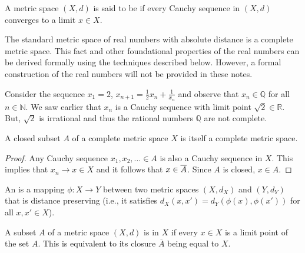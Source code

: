 \begin{definition}
A metric space $(X,d)$ is said to be  if every Cauchy sequence in $(X,d)$ converges to a limit $x \in X$.
\end{definition}

The standard metric space of real numbers with absolute distance is a complete metric space.
This fact and other foundational properties of the real numbers can be derived formally using the techniques described below.
However, a formal construction of the real numbers will not be provided in these notes.


\begin{example}
Consider the sequence $x_1 = 2$, $x_{n+1} = \frac{1}{2}x_n + \frac{1}{x_n}$ and observe that $x_n \in \mathbb{Q}$ for all $n\in \mathbb{N}$.
We saw earlier that $x_n$ is a Cauchy sequence with limit point $\sqrt{2} \in \mathbb{R}$.
But, $\sqrt{2}$ is irrational and thus the rational numbers $\mathbb{Q}$ are not complete.
\end{example}

\begin{theorem}
A closed subset $A$ of a complete metric space $X$ is itself a complete metric space.
\end{theorem}
\begin{proof}
Any Cauchy sequence $x_1,x_2,\ldots \in A$ is also a Cauchy sequence in $X$.
This implies that $x_n \to x \in X$ and it follows that $x \in \overline{A}$.
Since $A$ is closed, $x\in A$.
\end{proof}

\begin{definition}
An  is a mapping $\phi  \colon X \rightarrow Y$ between two metric spaces $(X,d_X)$ and $(Y,d_Y)$ that is distance preserving (i.e., it satisfies $d_X (x,x') = d_Y \left(\phi(x),\phi(x')\right)$ for all $x,x'\in X$).
\end{definition}

\begin{definition}
A subset $A$ of a metric space $(X,d)$ is  in $X$ if every $x\in X$ is a limit point of the set $A$.
This is equivalent to its closure $\overline{A}$ being equal to $X$.
\end{definition}

